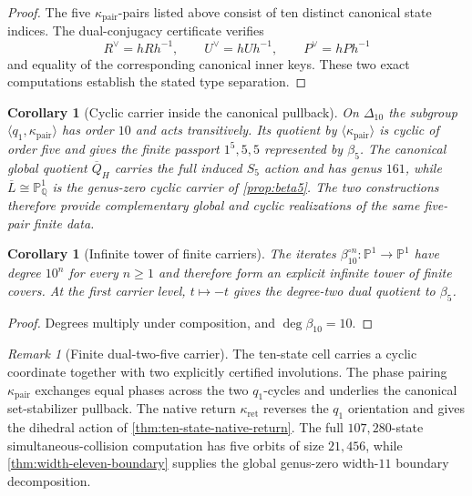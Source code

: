 \documentclass[11pt]{article}
\newtheorem{corollary}[theorem]{Corollary}
\theoremstyle{remark}
\newtheorem{remark}[theorem]{Remark}
\newcommand{\Pone}{\mathbb P^1}
\begin{document}
\begin{proof}
The five $\kappa_{\mathrm{pair}}$-pairs listed above consist of ten distinct canonical state indices.  The dual-conjugacy certificate verifies
\[
 R^\vee=hRh^{-1},\qquad U^\vee=hUh^{-1},\qquad P^\vee=hPh^{-1}
\]
and equality of the corresponding canonical inner keys.  These two exact computations establish the stated type separation.
\end{proof}

\begin{corollary}[Cyclic carrier inside the canonical pullback]
\label{cor:cyclic-inside-pullback}
On $\Delta_{10}$ the subgroup $\langle q_1,\kappa_{\mathrm{pair}}\rangle$ has order $10$ and acts transitively.  Its quotient by $\langle\kappa_{\mathrm{pair}}\rangle$ is cyclic of order five and gives the finite passport $1^5,5,5$ represented by $\beta_5$.  The canonical global quotient $\overline Q_H$ carries the full induced $S_5$ action and has genus $161$, while $\overline L\cong\mathbb P^1_{\mathbb Q}$ is the genus-zero cyclic carrier of \cref{prop:beta5}.  The two constructions therefore provide complementary global and cyclic realizations of the same five-pair finite data.
\end{corollary}

\begin{corollary}[Infinite tower of finite carriers]\label{cor:beta10-tower}
The iterates $\beta_{10}^{\circ n}:\Pone\to\Pone$ have degree $10^n$ for every $n\geq1$ and therefore form an explicit infinite tower of finite covers.  At the first carrier level, $t\mapsto-t$ gives the degree-two dual quotient to $\beta_5$.
\end{corollary}

\begin{proof}
Degrees multiply under composition, and $\deg\beta_{10}=10$.
\end{proof}

\begin{remark}[Finite dual-two-five carrier]\label{rem:dual-two-five-scope}
The ten-state cell carries a cyclic coordinate together with two explicitly certified involutions.  The phase pairing $\kappa_{\mathrm{pair}}$ exchanges equal phases across the two $q_1$-cycles and underlies the canonical set-stabilizer pullback.  The native return $\kappa_{\mathrm{ret}}$ reverses the $q_1$ orientation and gives the dihedral action of \cref{thm:ten-state-native-return}.  The full $107{,}280$-state simultaneous-collision computation has five orbits of size $21{,}456$, while \cref{thm:width-eleven-boundary} supplies the global genus-zero width-$11$ boundary decomposition.
\end{remark}
\end{document}
